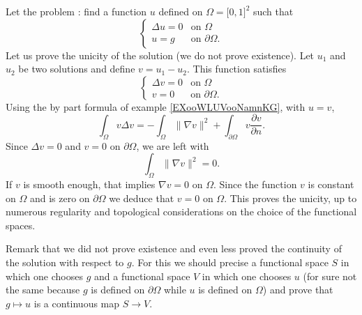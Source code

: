 \begin{example}
    Let the problem : find a function \( u\) defined on \( \Omega=\mathopen[ 0 , 1 \mathclose]^2\) such that
    \begin{equation}
         \begin{cases}
             \Delta u=0    &   \text{on } \Omega\\
             u=g    &    \text{on } \partial\Omega.
         \end{cases}
     \end{equation}
     Let us prove the unicity of the solution (we do not prove existence). Let \( u_1\) and \( u_2\) be two solutions and define \( v=u_1-u_2\). This function satisfies
     \begin{equation}
          \begin{cases}
              \Delta v=0    &   \text{on } \Omega\\
              v=0    &    \text{on }\partial\Omega.  
          \end{cases}
      \end{equation}
      Using the by part formula of example \ref{EXooWLUVooNamnKG}, with \( u=v\),
      \begin{equation}
          \int_{\Omega}v\Delta v=-\int_{\Omega}\| \nabla v \|^2+\int_{\partial\Omega}v\frac{ \partial v }{ \partial n }.
      \end{equation}
      Since \( \Delta v=0\) and \( v=0\) on \( \partial\Omega\), we are left with
      \begin{equation}
          \int_{\Omega}\| \nabla v \|^2=0.
      \end{equation}
      If \( v\) is smooth enough, that implies \( \nabla v=0\) on \( \Omega\). Since the function \( v\) is constant on \( \Omega\) and is zero on \( \partial\Omega\) we deduce that \( v=0\) on \( \Omega\). This proves the unicity, up to numerous regularity and topological considerations on the choice of the functional spaces.

     Remark that we did not prove existence and even less proved the continuity of the solution with respect to \( g\). For this we should precise a functional space \( S\) in which one chooses \( g\) and a functional space \( V\) in which one chooses \( u\) (for sure not the same because \( g\) is defined on \( \partial \Omega\) while \( u\) is defined on \( \Omega\)) and prove that \( g\mapsto u\) is a continuous map \( S\to V\).
\end{example}

